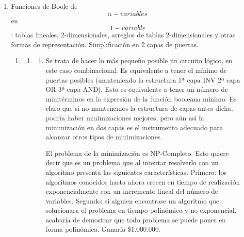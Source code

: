\documentclass[
]{article}
\begin{document}
\begin{enumerate}
\begin{enumerate}
\begin{enumerate}
\begin{enumerate}
        \[\mathtt{\mathrm{H}} = \begin{pmatrix}
        1 & 0 \\
        0 & 1 \\
        1 & 0 \\
        0 & 1
        \end{pmatrix}\]

        \[\begin{pmatrix}
        0 & 1 & 0 & 1 \\
        0 & 0 & 1 & 1
        \end{pmatrix}\rightarrow\begin{pmatrix}
        0 & 1 & 0 & 1 \\
        0 & 0 & 1 & 1 \\
        0 & 1 & 0 & 1 \\
        0 & 0 & 1 & 1
        \end{pmatrix}\]
      \end{enumerate}
    \end{enumerate}
  \end{enumerate}
\item
  Funciones de Boole de \[n - \mathit{variables}\] en
  \[1 - \mathit{variable}\]: tablas lineales, 2-dimensiona\-les,
  arreglos de tablas 2-dimensionales y otras formas de representación.
  Simplificación en 2 capas de puertas.

  \begin{enumerate}
  \def\labelenumii{\arabic{enumii}.}
  \item
    \begin{enumerate}
    \def\labelenumiii{\arabic{enumiii}.}
    \item
      \begin{enumerate}
      \def\labelenumiv{\arabic{enumiv}.}
      \item
        Se trata de hacer lo más pequeño posible un circuito lógico, en
        este caso combinacional. Es equivalente a tener el mínimo de
        puertas posibles (manteniendo la estructura 1ª capa INV 2ª capa
        OR 3ª capa AND). Esto es equivalente a tener un número de
        minitérminos en la expresión de la función booleana mínimo. Es
        claro que si no mantenemos la estructura de capas antes dicha,
        podría haber minimizaciones mejores, pero aún así la
        minimización en dos capas es el instrumento adecuado para
        alcanzar otros tipos de minimizaciones.

        El problema de la minimización es NP-Completo. Esto quiere decir
        que es un problema que al intentar resolverlo con un algoritmo
        presenta las siguientes características. Primero: los algoritmos
        conocidos hasta ahora crecen en tiempo de realización
        exponencialmente con un incremento lineal del número de
        variables. Segundo: si alguien encontrase un algoritmo que
        solucionara el problema en tiempo polinómico y no exponencial,
        acabaría de demostrar que todo problema se puede poner en forma
        polinómica. Ganaría \$1.000.000.


\end{enumerate}
\end{enumerate}
\end{enumerate}
\end{enumerate}
\end{document}
